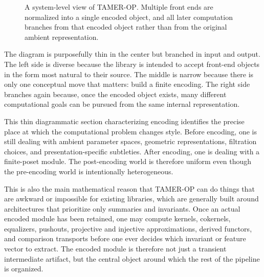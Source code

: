 \documentclass[11pt]{article}
\newcommand{\TAMER}{\textsc{TAMER-OP}}
\theoremstyle{definition}
\theoremstyle{remark}
\begin{document}
\begin{figure}[h]
\caption{A system-level view of \TAMER.  Multiple front ends are normalized into a single encoded object, and all later computation branches from that encoded object rather than from the original ambient representation.}
\label{fig:system-overview}
\end{figure}

The diagram is purposefully thin in the center but branched in input and output.  The left side is diverse because the library is intended to accept front-end objects in the form most natural to their source.  The middle is narrow because there is only one conceptual move that matters: build a finite encoding.  The right side branches again because, once the encoded object exists, many different computational goals can be pursued from the same internal representation.

This thin diagrammatic section characterizing encoding identifies the precise place at which the computational problem changes style. Before encoding, one is still dealing with ambient parameter spaces, geometric representations, filtration choices, and presentation-specific subtleties.  After encoding, one is dealing with a finite-poset module.  The post-encoding world is therefore uniform even though the pre-encoding world is intentionally heterogeneous.

This is also the main mathematical reason that \TAMER{} can do things that are awkward or impossible for existing libraries, which are generally built around architectures that prioritize only summaries and invariants.  Once an actual encoded module has been retained, one may compute kernels, cokernels, equalizers, pushouts, projective and injective approximations, derived functors, and comparison transports before one ever decides which invariant or feature vector to extract.  The encoded module is therefore not just a transient intermediate artifact, but the central object around which the rest of the pipeline is organized.
\end{document}
